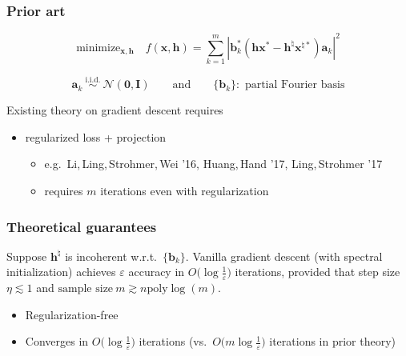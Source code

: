\documentclass[compress,
mathserif,wide,%
]{beamer}
\begin{document}
\begin{frame}
	\frametitle{Prior art}

\[
	\text{minimize}_{\bm{x},\bm{h}}\quad f(\bm{x},\bm{h})=\sum_{k=1}^{m}\left|\bm{b}_{k}^{*}\left(\bm{h}\bm{x}^{*}-\bm{h}^{\natural}\bm{x}^{\natural*}\right)\bm{a}_{k}\right|^{2}
\]


\[
	\bm{a}_k ~\overset{\mathrm{i.i.d.}}{\sim}~ \mathcal{N}(\bm{0},\bm{I}) \qquad \text{and} \qquad \{\bm{b}_k\}: \text{ partial Fourier basis}
\]


\vfill

\pause
Existing theory on gradient descent requires  
\medskip
\begin{itemize}
  \itemsep1em
  \item regularized loss + projection 
  \begin{itemize}
        \itemsep0.5em
	\item e.g.~Li,\,Ling,\,Strohmer,\,Wei '16,  Huang,\,Hand '17,  Ling,\,Strohmer '17
	\pause
	\item requires $m$ iterations even with regularization
  \end{itemize}
\end{itemize}

\end{frame}


\begin{frame}
	\frametitle{Theoretical guarantees}
	\begin{theorem}
Suppose $\bm{h}^\natural$ is incoherent w.r.t.~$\{\bm{b}_k\}$. \alert{Vanilla gradient descent} (with spectral initialization) achieves $\varepsilon$ accuracy in $O\big(\log \frac{1}{\varepsilon}\big)$ iterations, 
provided that step size $\eta \lesssim 1$ and
$ \text{sample size}~ m \gtrsim n \mathrm{poly}\log(m)$.
\end{theorem}

\vfill

\begin{itemize}
	\itemsep0.5em
	\item Regularization-free
	\item Converges in $O\big(\log \frac{1}{\varepsilon}\big)$ iterations (vs.~$O\big(m\log \frac{1}{\varepsilon}\big)$ iterations in prior theory)
\end{itemize}
\end{frame}
\end{document}
